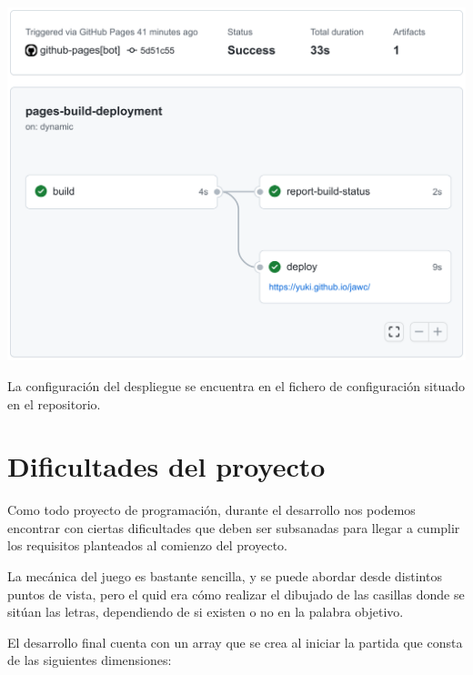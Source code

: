 \documentclass{\ClassPath/viu-tfm-template}
\begin{document}
\vspace{-1em}
\begin{center}
    \includegraphics[width=0.7\linewidth]{img/deploy.png}
\end{center}
\vspace{-1em}

La configuración del despliegue se encuentra en el fichero de configuración   situado en el repositorio.


\chapter{Dificultades del proyecto}

Como todo proyecto de programación, durante el desarrollo nos podemos encontrar con ciertas dificultades que deben ser subsanadas para llegar a cumplir los requisitos planteados al comienzo del proyecto.

La mecánica del juego es bastante sencilla, y se puede abordar desde distintos puntos de vista, pero el quid era cómo realizar el dibujado de las casillas donde se sitúan las letras, dependiendo de si existen o no en la palabra objetivo.

El desarrollo final cuenta con un array que se crea al iniciar la partida que consta de las siguientes dimensiones:
\end{document}
